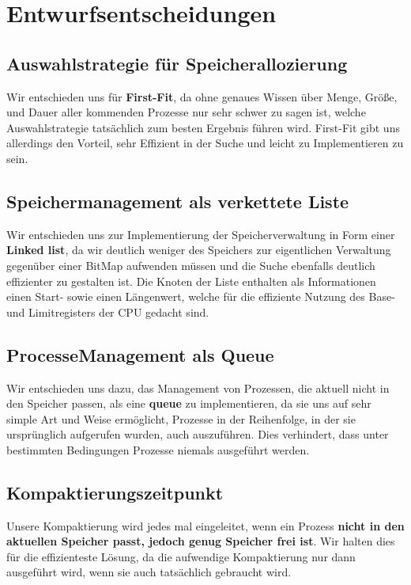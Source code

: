 \section{Entwurfsentscheidungen}
\subsection{Auswahlstrategie für Speicherallozierung}
Wir entschieden uns für \textbf{First-Fit}, da ohne genaues Wissen über Menge, Größe, und Dauer aller kommenden Prozesse nur sehr schwer zu sagen ist, welche Auswahlstrategie tatsächlich zum besten Ergebnis führen wird. First-Fit gibt uns allerdings den Vorteil, sehr Effizient in der Suche und leicht zu Implementieren zu sein.

\subsection{Speichermanagement als verkettete Liste}
Wir entschieden uns zur Implementierung der Speicherverwaltung in Form einer \textbf{Linked list}, da wir deutlich weniger des Speichers zur eigentlichen Verwaltung gegenüber einer BitMap aufwenden müssen und die Suche ebenfalls deutlich effizienter zu gestalten ist. Die Knoten der Liste enthalten als Informationen einen Start- sowie einen Längenwert, welche für die effiziente Nutzung des Base- und Limitregisters der CPU gedacht sind.

\subsection{ProcesseManagement als Queue}
Wir entschieden uns dazu, das Management von Prozessen, die aktuell nicht in den Speicher passen, als eine \textbf{queue} zu implementieren, da sie uns auf sehr simple Art und Weise ermöglicht, Prozesse in der Reihenfolge, in der sie ursprünglich aufgerufen wurden, auch auszuführen. Dies verhindert, dass unter bestimmten Bedingungen Prozesse niemals ausgeführt werden.

\subsection{Kompaktierungszeitpunkt}
Unsere Kompaktierung wird jedes mal eingeleitet, wenn ein Prozess \textbf{nicht in den aktuellen Speicher passt, jedoch genug Speicher frei ist}. Wir halten dies für die effizienteste Lösung, da die aufwendige Kompaktierung nur dann ausgeführt wird, wenn sie auch tatsächlich gebraucht wird.
